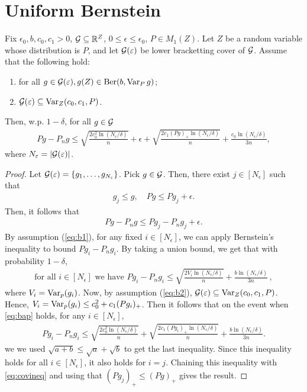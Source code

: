\documentclass[twoside]{article}
\begin{document}
\section{Uniform Bernstein}
\begin{theorem}
    Fix $\epsilon_0, b, c_0, c_1 > 0$, $\mathcal{G} \subseteq \mathbb{R}^Z$, $0 \leq \epsilon \leq \epsilon_0$, $P \in M_1(Z)$.  Let $Z$ be a random variable whose distribution is $P$, 
    and let $\mathcal{G}(\varepsilon)$ be lower bracketting cover of $\mathcal{G}$. Assume that the following hold:
\begin{enumerate}
    \item \label{eq:b1} for all $g \in \mathcal{G}(\varepsilon), g(Z) \in \mathrm{Ber}(b, \operatorname{Var}_{P}g)$;
    \item \label{eq:b2} $\mathcal{G}(\varepsilon) \subseteq \operatorname{Var}_Z(c_0, c_1, P)$.
\end{enumerate}
Then, w.p. $1- \delta$, for all $g \in \mathcal{G}$
\begin{align}
    Pg - P_n g \leq \sqrt{\frac{2 c_0^2 \ln(N_{\epsilon}/\delta)}{n}} + \epsilon + \sqrt{\frac{2 c_1 (Pg)_+ \ln(N_\epsilon / \delta)}{n}} + \frac{c_0 \ln(N_\epsilon/\delta)}{3n},
\end{align}
where $N_\varepsilon = |\mathcal{G}(\varepsilon)|$.
\end{theorem}

\begin{proof} Let $\mathcal{G}(\varepsilon) = \{g_1,\dots,g_{N_\varepsilon}\}$. 
Pick $g \in \mathcal{G}$.
Then, there exist $j \in [N_\epsilon]$ such that 
\begin{align}
    g_j \leq g, \quad Pg \leq P g_j + \epsilon.
\end{align}
Then, it follows that
\begin{align}
    Pg - P_n g \leq P g_j - P_n g_j + \epsilon.
    \label{eq:covineq}
\end{align}
By assumption (\ref{eq:b1}), for any fixed $i\in [N_\epsilon]$,
we can apply Bernstein's inequality to bound $P g_i - P_n g_i$. By taking a union bound, we get that 
with probability $1-\delta$,
\begin{align}
\label{eq:bap}
\text{for all } i\in [N_\epsilon] \text{ we have }
    P g_i - P_n g_i \leq \sqrt{\frac{2 V_i \ln(N_\epsilon/\delta)}{n}} + \frac{b \ln(N_\epsilon/\delta)}{3n}\,, 
\end{align}
where $V_i = \operatorname{Var}_p(g_i)$.
Now, 
by assumption (\ref{eq:b2}),
$\mathcal{G}(\varepsilon) \subseteq \operatorname{Var}_Z(c_0, c_1, P)$. Hence, $V_i = \operatorname{Var}_p(g_i) \leq c_0^2 + c_1 ( P g_i)_{+}$.  Then it follows that on the event when \cref{eq:bap} holds, for any $i\in [N_\epsilon]$,
\begin{align}
    P g_i - P_n g_i \leq \sqrt{\frac{2 c_0^2 \ln(N_\epsilon/\delta)}{n}} + \sqrt{\frac{2 c_1 (P g_i)_+ \ln(N_\epsilon/\delta)}{n}} + \frac{b \ln(N_\epsilon/\delta)}{3n}. \label{eq:8_13}
\end{align}
we we used $\sqrt{a + b} \leq \sqrt{a} + \sqrt{b}$ to get the last inequality.
Since this inequality holds for all $i\in [N_\epsilon]$, it also holds for $i=j$.
Chaining this inequality with \cref{eq:covineq} and using that $(P g_j)_{+} \leq (P g)_{+}$ gives the result.
\end{proof}
\end{document}
